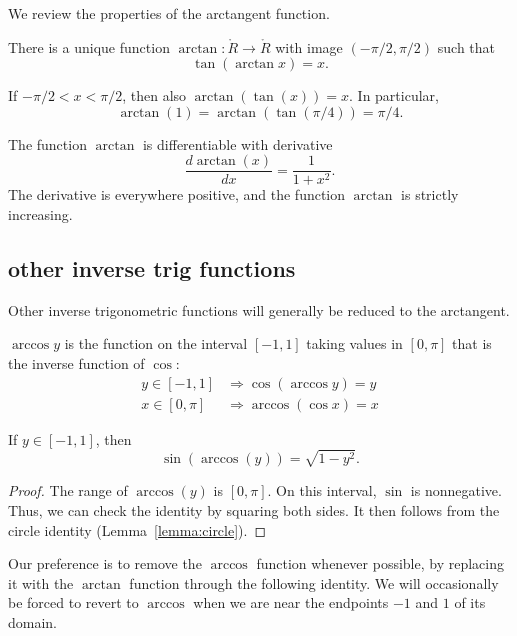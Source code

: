 We review the properties of the arctangent function.

\begin{definition}\label{definition:arctan}
There is a unique function $\arctan:\ring{R}\to\ring{R}$ with
image $(-\pi/2,\pi/2)$ such that
    $$\tan(\arctan x) =x.$$
\end{definition}

If $-\pi/2 < x < \pi/2$, then also $\arctan(\tan(x)) = x$. In
particular,
    $$\arctan(1) = \arctan(\tan(\pi/4)) = \pi/4.$$


The function $\arctan$ is differentiable with derivative
    $$\frac{d \arctan(x)}{dx} = \frac{1}{1 + x^2}.$$
The derivative is everywhere positive, and the function $\arctan$ is
strictly increasing.


\subsection{other inverse trig functions}

Other inverse trigonometric functions will generally be reduced to
the arctangent.

\begin{definition}\label{definition:arccos}
$\arccos y$ is the function on the interval $[-1,1]$
taking values in $[0,\pi]$ that is the inverse function of $\cos$:
    $$\begin{array}{lll}
        y\in [-1,1] &\Rightarrow \cos(\arccos y) = y\\
        x\in[0,\pi] &\Rightarrow \arccos(\cos x) = x
    \end{array}$$
\end{definition}

\begin{lemma}\label{lemma:sin-arccos} If $y\in[-1,1]$, then
    $$\sin(\arccos(y)) = \sqrt{1-y^2}.$$
\end{lemma}

\begin{proof}
    The range of $\arccos(y)$ is $[0,\pi]$.  On this interval, $\sin$
    is nonnegative.  Thus, we can check the identity by squaring
    both sides.  It then follows from the circle identity
    (Lemma~\ref{lemma:circle}).
\end{proof}


Our preference is to remove the $\arccos$ function whenever
possible, by replacing it with the $\arctan$ function through the
following identity.  We will occasionally be forced to revert to
$\arccos$ when we are near the endpoints $-1$ and $1$ of its domain.

